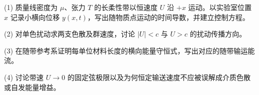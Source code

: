 (1) 质量线密度为 \(\mu\)、张力 \(T\) 的长柔性带以恒速度 \(U\) 沿 \(+x\) 运动。以实验室位置 \(x\) 记录小横向位移 \(y(x,t)\)，写出随物质点运动的时间导数，并建立控制方程。

(2) 对单色扰动求两支色散及群速度，讨论 \(|U|<c\) 与 \(U>c\) 的扰动传播方向。

(3) 在随带参考系证明每单位材料长度的横向能量守恒式，写出对应的随带输运能流。

(4) 讨论带速 \(U\to0\) 的固定弦极限以及为何恒定输送速度不应被误解成介质色散或自发能量增益。
